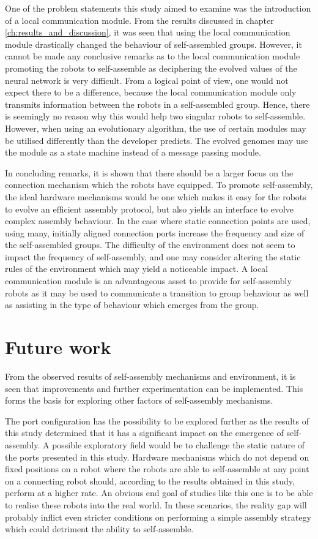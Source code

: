 One of the problem statements this study aimed to examine was the introduction of a local communication module. From the results discussed in chapter  \ref{ch:results_and_discussion}, it was seen that using the local communication module drastically changed the behaviour of self-assembled groups. 
However, it cannot be made any conclusive remarks as to the local communication module promoting the robots to self-assemble as deciphering the evolved values of the neural network is very difficult.
From a logical point of view, one would not expect there to be a difference, because the local communication module only transmits information between the robots in a self-assembled group. 
Hence, there is seemingly no reason why this would help two singular robots to self-assemble.
However, when using an evolutionary algorithm, the use of certain modules may be utilised differently than the developer predicts.
The evolved genomes may use the module as a state machine instead of a message passing module.

In concluding remarks, it is shown that there should be a larger focus on the connection mechanism which the robots have equipped.
To promote self-assembly, the ideal hardware mechanisms would be one which makes it easy for the robots to evolve an efficient assembly protocol, but also yields an interface to evolve complex assembly behaviour.
In the case where static connection points are used, using many, initially aligned connection ports increase the frequency and size of the self-assembled groups.
The difficulty of the environment does not seem to impact the frequency of self-assembly, and one may consider altering the static rules of the environment which may yield a noticeable impact.
A local communication module is an advantageous asset to provide for self-assembly robots as it may be used to communicate a transition to group behaviour as well as assisting in the type of behaviour which emerges from the group. 
  


\section{Future work}
From the observed results of self-assembly mechanisms and environment, it is seen that improvements and further experimentation can be implemented. 
This forms the basis for exploring other factors of self-assembly mechanisms.

The port configuration has the possibility to be explored further as the results of this study determined that it has a significant impact on the emergence of self-assembly. 
A possible exploratory field would be to challenge the static nature of the ports presented in this study.
Hardware mechanisms which do not depend on fixed positions on a robot where the robots are able to self-assemble at any point on a connecting robot should, according to the results obtained in this study, perform at a higher rate.
An obvious end goal of studies like this one is to be able to realise these robots into the real world.
In these scenarios, the reality gap will probably inflict even stricter conditions on performing a simple assembly strategy which could detriment the ability to self-assemble.

